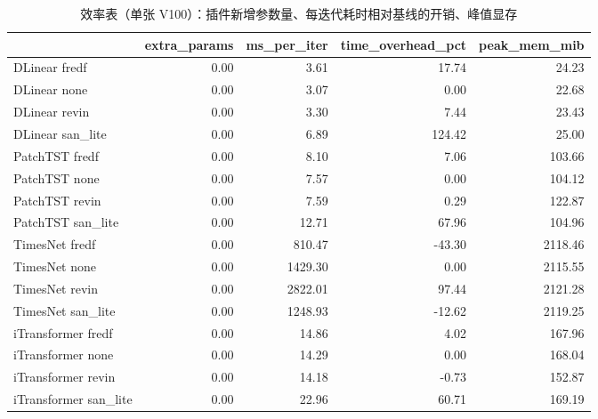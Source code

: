\begin{table}[htbp]
\centering
\small
\caption{效率表（单张 V100）：插件新增参数量、每迭代耗时相对基线的开销、峰值显存}
\label{tab:efficiency}
\begin{tabular}{lrrrr}
\toprule
 & extra\_params & ms\_per\_iter & time\_overhead\_pct & peak\_mem\_mib \\
\midrule
DLinear fredf & 0.00 & 3.61 & 17.74 & 24.23 \\
DLinear none & 0.00 & 3.07 & 0.00 & 22.68 \\
DLinear revin & 0.00 & 3.30 & 7.44 & 23.43 \\
DLinear san\_lite & 0.00 & 6.89 & 124.42 & 25.00 \\
PatchTST fredf & 0.00 & 8.10 & 7.06 & 103.66 \\
PatchTST none & 0.00 & 7.57 & 0.00 & 104.12 \\
PatchTST revin & 0.00 & 7.59 & 0.29 & 122.87 \\
PatchTST san\_lite & 0.00 & 12.71 & 67.96 & 104.96 \\
TimesNet fredf & 0.00 & 810.47 & -43.30 & 2118.46 \\
TimesNet none & 0.00 & 1429.30 & 0.00 & 2115.55 \\
TimesNet revin & 0.00 & 2822.01 & 97.44 & 2121.28 \\
TimesNet san\_lite & 0.00 & 1248.93 & -12.62 & 2119.25 \\
iTransformer fredf & 0.00 & 14.86 & 4.02 & 167.96 \\
iTransformer none & 0.00 & 14.29 & 0.00 & 168.04 \\
iTransformer revin & 0.00 & 14.18 & -0.73 & 152.87 \\
iTransformer san\_lite & 0.00 & 22.96 & 60.71 & 169.19 \\
\bottomrule
\end{tabular}
\end{table}
